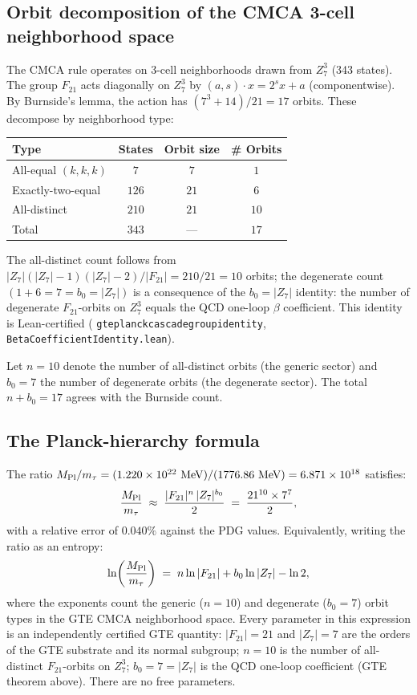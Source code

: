 \documentclass[11pt]{article}
\theoremstyle{remark}
\newcommand{\lean}[1]{%
  \penalty-100
  \begingroup\def\_{\textunderscore\allowbreak}\texttt{#1}\endgroup}
\begin{document}
\subsection{Orbit decomposition of the CMCA 3-cell neighborhood space}

The CMCA rule operates on 3-cell neighborhoods drawn from $Z_7^3$ (343 states).
The group $F_{21}$ acts diagonally on $Z_7^3$ by $(a,s) \cdot x = 2^s x + a$
(componentwise).
By Burnside's lemma, the action has $(7^3 + 14)/21 = 17$ orbits.
These decompose by neighborhood type:

\begin{center}
\begin{tabular}{lccc}
\toprule
Type & States & Orbit size & \# Orbits \\
\midrule
All-equal $(k,k,k)$ & $7$ & $7$ & $1$ \\
Exactly-two-equal & $126$ & $21$ & $6$ \\
All-distinct & $210$ & $21$ & $10$ \\
\midrule
Total & $343$ & --- & $17$ \\
\bottomrule
\end{tabular}
\end{center}

The all-distinct count follows from $|Z_7|(|Z_7|-1)(|Z_7|-2)/|F_{21}| = 210/21 = 10$
orbits; the degenerate count $(1 + 6 = 7 = b_0 = |Z_7|)$ is a consequence of the
$b_0 = |Z_7|$ identity: the number of degenerate $F_{21}$-orbits on $Z_7^3$ equals
the QCD one-loop $\beta$ coefficient.
This identity is Lean-certified (\lean{gte\_planck\_cascade\_group\_identity},
\lean{BetaCoefficientIdentity.lean}).

Let $n = 10$ denote the number of all-distinct orbits (the generic sector) and
$b_0 = 7$ the number of degenerate orbits (the degenerate sector).
The total $n + b_0 = 17$ agrees with the Burnside count.

\subsection{The Planck-hierarchy formula}

The ratio $M_{\rm Pl}/m_\tau = (1.220 \times 10^{22}~\text{MeV})/(1776.86~\text{MeV})
= 6.871 \times 10^{18}$ satisfies:
\[
  \frac{M_{\rm Pl}}{m_\tau}
  \;\approx\;
  \frac{|F_{21}|^{n}\,|Z_7|^{b_0}}{2}
  \;=\;
  \frac{21^{10} \times 7^7}{2},
\]
with a relative error of $0.040\%$ against the PDG values.
Equivalently, writing the ratio as an entropy:
\[
  \ln\!\left(\frac{M_{\rm Pl}}{m_\tau}\right)
  \;=\;
  n\ln|F_{21}| + b_0\ln|Z_7| - \ln 2,
\]
where the exponents count the generic ($n = 10$) and degenerate ($b_0 = 7$)
orbit types in the GTE CMCA neighborhood space.
Every parameter in this expression is an independently certified GTE quantity:
$|F_{21}| = 21$ and $|Z_7| = 7$ are the orders of the GTE substrate and its
normal subgroup; $n = 10$ is the number of all-distinct $F_{21}$-orbits on $Z_7^3$;
$b_0 = 7 = |Z_7|$ is the QCD one-loop coefficient (GTE theorem above).
There are no free parameters.
\end{document}
